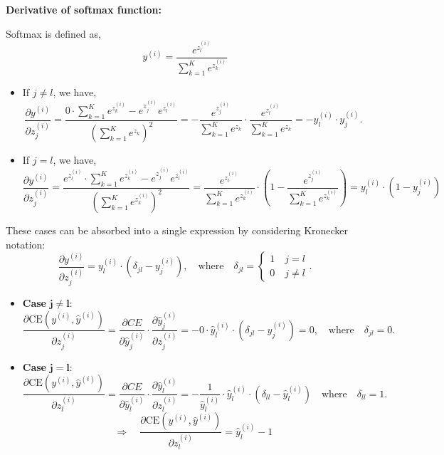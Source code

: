 \documentclass{article}
\begin{document}
\begin{enumerate}[label=(\alph*)]
\textbf{Derivative of softmax function:}
\begin{tcolorbox}[colback=gray!20!white,colframe=gray!50!black]
Softmax is defined as,
\[
y^{(i)} = \frac{e^{z^{(i)}_{l}}}{\sum\limits_{k=1}^{K} e^{z^{(i)}_{k}}}
\]
\begin{itemize}
    \item If $j\neq l$, we have,
    \[
    \frac{\partial y^{(i)}}{\partial z^{(i)}_j} = \frac{0\cdot \sum\limits_{k=1}^{K} e^{z^{(i)}_{k}} - e^{z^{(i)}_{j}}e^{z^{(i)}_{l}}}{\left(\sum\limits_{k=1}^{K} e^{z_{k}}\right)^2} = -\frac{e^{z^{(i)}_{j}}}{\sum\limits_{k=1}^{K} e^{z_{k}}}\cdot\frac{e^{z^{(i)}_{l}}}{\sum\limits_{k=1}^{K} e^{z_{k}}} = -y^{(i)}_{l}\cdot y^{(i)}_{j}.
    \]
    \item If $j =l$, we have,
    \[
    \frac{\partial y^{(i)}}{\partial z^{(i)}_j} = \frac{e^{z^{(i)}_{l}}\cdot \sum\limits_{k=1}^{K} e^{z^{(i)}_{k}} - e^{z^{(i)}_{j}}e^{z^{(i)}_{l}}}{\left(\sum\limits_{k=1}^{K} e^{z^{(i)}_{k}}\right)^2} =\frac{e^{z^{(i)}_{l}}}{\sum\limits_{k=1}^{K} e^{z^{(i)}_{k}}}\cdot \left(1 - \frac{e^{z^{(i)}_{j}}}{\sum\limits_{k=1}^{K} e^{z^{(i)}_{k}}}\right) = y^{(i)}_{l}\cdot(1 - y^{(i)}_{j})
    \]
\end{itemize}
These cases can be absorbed into a single expression by considering Kronecker notation:
\[
\frac{\partial y^{(i)}}{\partial z^{(i)}_j} = y^{(i)}_{l}\cdot(\delta_{jl} - y^{(i)}_{j}), \quad\mbox{where}\quad \delta_{jl}=\begin{cases}
    1\quad j=l\\
    0\quad j\neq l
\end{cases}.
\]
\end{tcolorbox}

\begin{itemize}
\item \textbf{Case} $ \boldsymbol{j \neq l }$:
\[
 \frac{\partial \text{CE}(y^{(i)}, \hat{y}^{(i)})}{\partial z^{(i)}_j} = \frac{\partial CE}{\partial \hat{y}^{(i)}_j} \cdot \frac{\partial \hat{y}^{(i)}_j}{\partial z^{(i)}_j} = -0\cdot \hat{y}^{(i)}_{l}\cdot(\delta_{jl} - \hat{y}^{(i)}_{j}) = 0, \quad \mbox{where}\quad \delta_{jl}=0.
\]

\item \textbf{Case} $ \boldsymbol{j = l }$:
\[
\frac{\partial \text{CE}(y^{(i)}, \hat{y}^{(i)})}{\partial z^{(i)}_l} = \frac{\partial CE}{\partial \hat{y}^{(i)}_l} \cdot \frac{\partial \hat{y}^{(i)}_l}{\partial z^{(i)}_l} = -\frac{1}{\hat{y}^{(i)}_l} \cdot \hat{y}^{(i)}_{l}\cdot(\delta_{ll} - \hat{y}^{(i)}_{l}) \quad \mbox{where}\quad \delta_{ll}=1.
\]
\[
\Rightarrow\quad\frac{\partial \text{CE}(y^{(i)}, \hat{y}^{(i)})}{\partial z^{(i)}_l} = \hat{y}^{(i)}_{l} - 1 
\]
\end{itemize}


\end{enumerate}
\end{document}
